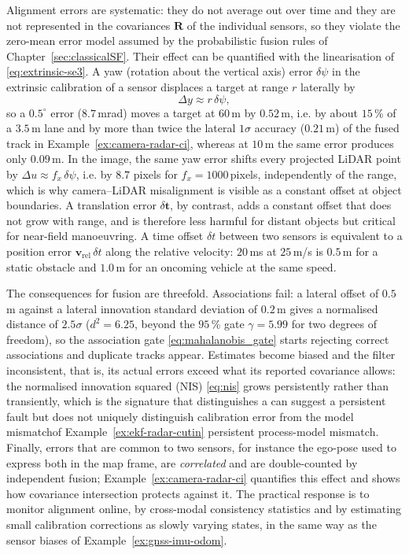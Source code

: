 \documentclass[graybox,envcountchap]{style/SNmono}
\providecommand{\DIFadd}[1]{{\protect\color{blue} #1}} %
\providecommand{\DIFdel}[1]{{\protect\color{red} #1}} %
\providecommand{\DIFaddbegin}{} %
\providecommand{\DIFaddend}{} %
\providecommand{\DIFdelbegin}{} %
\providecommand{\DIFdelend}{} %
\begin{document}
Alignment errors are systematic: they do not average out over time and they are not represented in the covariances $\mathbf{R}$ of the individual sensors, so they violate the zero-mean error model assumed by the probabilistic fusion rules of Chapter~\ref{sec:classicalSF}. Their effect can be quantified with the linearisation of \eqref{eq:extrinsic-se3}. A yaw (rotation about the vertical axis) error $\delta\psi$ in the extrinsic calibration of a sensor displaces a target at range $r$ laterally by
\begin{equation}
\Delta y \approx r\,\delta\psi,
\label{eq:yaw-error-lateral}
\end{equation}
so a $0.5^{\circ}$ error ($8.7$\,mrad) moves a target at $60$\,m by $0.52$\,m, i.e. by about $15$\,\% of a $3.5$\,m lane and by more than twice the lateral $1\sigma$ accuracy ($0.21$\,m) of the fused track in Example~\ref{ex:camera-radar-ci}, whereas at $10$\,m the same error produces only $0.09$\,m. In the image, the same yaw error shifts every projected LiDAR point by $\Delta u\approx f_{x}\,\delta\psi$, i.e. by $8.7$ pixels for $f_{x}=1000$\,pixels, independently of the range, which is why camera--LiDAR misalignment is visible as a constant offset at object boundaries. A translation error $\delta\mathbf{t}$, by contrast, adds a constant offset that does not grow with range, and is therefore less harmful for distant objects but critical for near-field manoeuvring. A time offset $\delta t$ between two sensors is equivalent to a position error $\mathbf{v}_{\mathrm{rel}}\,\delta t$ along the relative velocity: $20$\,ms at $25$\,m/s is $0.5$\,m for a static obstacle and $1.0$\,m for an oncoming vehicle at the same speed.

The consequences for fusion are threefold. Associations fail: a lateral offset of $0.5$\,m against a lateral innovation standard deviation of $0.2$\,m gives a normalised distance of $2.5\sigma$ ($d^{2}=6.25$, beyond the $95$\,\% gate $\gamma=5.99$ for two degrees of freedom), so the association gate \eqref{eq:mahalanobis_gate} starts rejecting correct associations and duplicate tracks appear. Estimates become biased and the filter inconsistent, that is, its actual errors exceed what its reported covariance allows: the normalised innovation squared (NIS) \eqref{eq:nis} grows persistently rather than transiently, which \DIFdelbegin \DIFdel{is the signature that distinguishes a }\DIFdelend \DIFaddbegin \DIFadd{can suggest a persistent fault but does not uniquely distinguish }\DIFaddend calibration error from \DIFdelbegin \DIFdel{the model mismatchof Example~\ref{ex:ekf-radar-cutin}}\DIFdelend \DIFaddbegin \DIFadd{persistent process-model mismatch}\DIFaddend . Finally, errors that are common to two sensors, for instance the ego-pose used to express both in the map frame, are \emph{correlated} and are double-counted by independent fusion; Example~\ref{ex:camera-radar-ci} quantifies this effect and shows how covariance intersection protects against it. The practical response is to monitor alignment online, by cross-modal consistency statistics and by estimating small calibration corrections as slowly varying states, in the same way as the sensor biases of Example~\ref{ex:gnss-imu-odom}.
\end{document}
